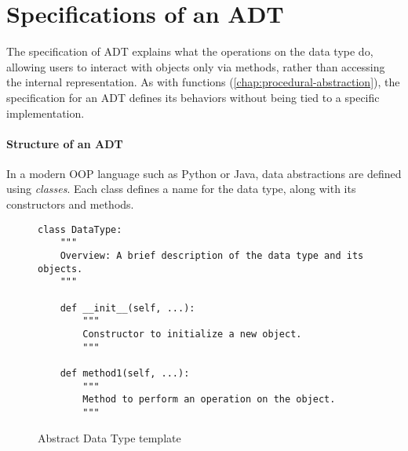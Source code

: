 \documentclass[oneside,11pt,dvipsnames]{book}
\begin{document}






\section{Specifications of an ADT}

The specification of ADT explains what the operations on the data type do, allowing users to interact with objects only via methods, rather than accessing the internal representation. 
As with functions (\autoref{chap:procedural-abstraction}), the specification for an ADT defines its behaviors without being tied to a specific implementation.


\paragraph{Structure of an ADT} In a modern OOP language such as Python or Java, data abstractions are defined using \emph{classes}. Each class defines a name for the data type, along with its constructors and methods.

\begin{figure}
    \begin{lstlisting}
class DataType:
    """
    Overview: A brief description of the data type and its objects.
    """

    def __init__(self, ...):
        """
        Constructor to initialize a new object.
        """

    def method1(self, ...):
        """
        Method to perform an operation on the object.
        """
    \end{lstlisting}
    \caption{Abstract Data Type template}\label{ex:adt-template}
\end{figure}
\end{document}
